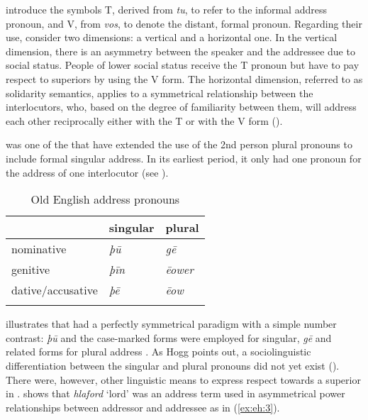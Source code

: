 \documentclass[output=paper,hidelinks]{langscibook}
\begin{document}
\citeauthor{Brown1960} introduce the symbols T, derived from  \textit{tu}, to refer to the informal address pronoun, and V, from  \textit{vos}, to denote the distant, formal pronoun. Regarding their use, \citeauthor{Brown1960} consider two dimensions: a vertical and a horizontal one. In the vertical dimension, there is an asymmetry between the speaker and the addressee due to social status. People of lower social status receive the T pronoun but have to pay respect to superiors by using the V form. The horizontal dimension, referred to as solidarity semantics, applies to a symmetrical relationship between the interlocutors, who, based on the degree of familiarity between them, will address each other reciprocally either with the T or with the V form (\citeyear[254--261]{Brown1960}).

 was one of the  that have extended the use of the 2nd person plural pronouns to include formal singular address. In its earliest period, it only had one pronoun for the address of one interlocutor (see ).

\begin{table}
\caption{Old English address pronouns\label{tab1elsweiler}}
 \begin{tabular}{l ll} 
  \lsptoprule
            & singular & plural\\ \midrule
  nominative        & \itshape þū   & \itshape gē \\
  genitive          & \itshape þīn  & \itshape ēower  \\
  dative/accusative & \itshape þē   & \itshape ēow \\
  \lspbottomrule
 \end{tabular}
\end{table}

 illustrates that  had a perfectly symmetrical paradigm with a simple number contrast: \textit{þū} and the case-marked forms were employed for singular, \textit{gē} and related forms for plural address \citep[148]{Lass1999}. As Hogg points out, a sociolinguistic differentiation between the singular and plural pronouns did not yet exist (\citeyear[144]{Hogg1992}). There were, however, other linguistic means to express respect towards a superior in . \citet[152--154]{Kohnen2008} shows that \textit{hlaford} \enquote*{lord} was an address term used in asymmetrical power relationships between addressor and addressee as in (\ref{ex:eh:3}).
\end{document}

